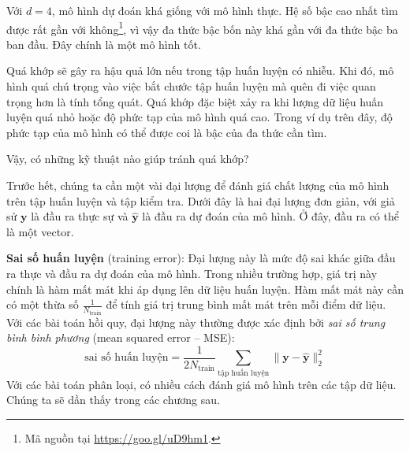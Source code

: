 
Với $d = 4$, mô hình dự đoán khá giống với mô hình thực. Hệ số bậc cao nhất tìm
được rất gần với không\footnote{Mã nguồn tại \url{https://goo.gl/uD9hm1}.}, vì
vậy đa thức bậc bốn này khá gần với đa thức bậc ba ban đầu. Đây chính là một mô
hình tốt.


Quá khớp sẽ gây ra hậu quả lớn nếu trong tập huấn luyện có nhiễu. Khi
đó, mô hình quá chú trọng vào việc bắt chước tập huấn luyện mà quên đi việc
quan trọng hơn là tính tổng quát. Quá khớp đặc biệt xảy ra khi lượng dữ liệu huấn
luyện quá nhỏ hoặc độ phức tạp của mô hình quá cao. Trong ví dụ trên đây, độ
phức tạp của mô hình có thể được coi là bậc của đa thức cần tìm.


Vậy, có những kỹ thuật nào giúp tránh quá khớp?

Trước hết, chúng ta cần một vài đại lượng để đánh giá chất lượng của mô hình
trên tập huấn luyện và tập kiểm tra. Dưới đây là hai đại lượng đơn giản, với
giả sử $\mathbf{y}$ là đầu ra thực sự và $\mathbf{\hat{y}}$ là đầu ra dự đoán
của mô hình. Ở đây, đầu ra có thể là một vector.

\textbf{Sai số huấn luyện} (training error): Đại lượng này là mức độ sai khác giữa đầu ra thực và đầu
ra dự đoán của mô hình. Trong nhiều trường hợp, giá trị này chính là hàm mất mát khi áp dụng lên dữ liệu huấn luyện. Hàm mất mát này cần có một thừa số $\displaystyle
\frac{1}{N_{\text{train}}}$ để tính giá trị trung bình mất mát
trên mỗi điểm dữ liệu. Với các bài toán hồi quy, đại lượng này thường được xác định bởi \textit{sai số trung bình bình phương} ({mean squared error -- MSE}):
\begin{equation*}
\text{sai số huấn luyện}= \frac{1}{2N_{\text{train}}} \sum_{\text{tập huấn luyện}}
\|\mathbf{y} - \mathbf{\hat{y}}\|_2^2
\end{equation*}
Với các bài toán phân loại, có nhiều cách đánh giá mô hình trên các tập dữ liệu. Chúng ta sẽ dần thấy trong các chương sau.

